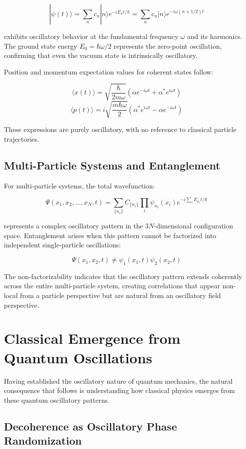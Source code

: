\documentclass[11pt]{article}
\theoremstyle{remark}
\begin{document}
$$|\psi(t)\rangle = \sum_n c_n |n\rangle e^{-iE_n t/\hbar} = \sum_n c_n |n\rangle e^{-i\omega(n + 1/2)t}$$

exhibits oscillatory behavior at the fundamental frequency $\omega$ and its harmonics. The ground state energy $E_0 = \hbar\omega/2$ represents the zero-point oscillation, confirming that even the vacuum state is intrinsically oscillatory.

Position and momentum expectation values for coherent states follow:

$$\langle x(t)\rangle = \sqrt{\frac{\hbar}{2m\omega}} (\alpha e^{-i\omega t} + \alpha^* e^{i\omega t})$$
$$\langle p(t)\rangle = i\sqrt{\frac{m\hbar\omega}{2}} (\alpha^* e^{i\omega t} - \alpha e^{-i\omega t})$$

These expressions are purely oscillatory, with no reference to classical particle trajectories.

\subsection{Multi-Particle Systems and Entanglement}

For multi-particle systems, the total wavefunction:

$$\Psi(x_1, x_2, \ldots, x_N, t) = \sum_{\{n_i\}} C_{\{n_i\}} \prod_i \psi_{n_i}(x_i) e^{-i\sum_i E_{n_i} t/\hbar}$$

represents a complex oscillatory pattern in the $3N$-dimensional configuration space. Entanglement arises when this pattern cannot be factorized into independent single-particle oscillations:

$$\Psi(x_1, x_2, t) \neq \psi_1(x_1, t) \psi_2(x_2, t)$$

The non-factorizability indicates that the oscillatory pattern extends coherently across the entire multi-particle system, creating correlations that appear non-local from a particle perspective but are natural from an oscillatory field perspective.

\section{Classical Emergence from Quantum Oscillations}

Having established the oscillatory nature of quantum mechanics, the natural consequence that follows is understanding how classical physics emerges from these quantum oscillatory patterns.

\subsection{Decoherence as Oscillatory Phase Randomization}
\end{document}
